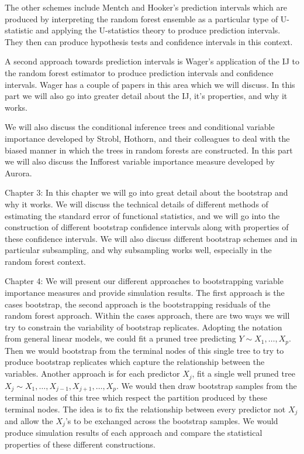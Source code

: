 \documentclass[12pt,twoside]{reedthesis}
\theoremstyle{definition}
\theoremstyle{definition}
\theoremstyle{definition}
\theoremstyle{remark}
\begin{document}
The other schemes include Mentch and Hooker's prediction intervals which
are produced by interpreting the random forest ensemble as a particular
type of U-statistic and applying the U-statistics theory to produce
prediction intervals. They then can produce hypothesis tests and
confidence intervals in this context.

A second approach towards prediction intervals is Wager's application of
the IJ to the random forest estimator to produce prediction intervals
and confidence intervals. Wager has a couple of papers in this area
which we will discuss. In this part we will also go into greater detail
about the IJ, it's properties, and why it works.

We will also discuss the conditional inference trees and conditional
variable importance developed by Strobl, Hothorn, and their colleagues
to deal with the biased manner in which the trees in random forests are
constructed. In this part we will also discuss the Infforest variable
importance measure developed by Aurora.

Chapter 3: In this chapter we will go into great detail about the
bootstrap and why it works. We will discuss the technical details of
different methods of estimating the standard error of functional
statistics, and we will go into the construction of different bootstrap
confidence intervals along with properties of these confidence
intervals. We will also discuss different bootstrap schemes and in
particular subsampling, and why subsampling works well, especially in
the random forest context.

Chapter 4: We will present our different approaches to bootstrapping
variable importance measures and provide simulation results. The first
approach is the cases bootstrap, the second approach is the
bootstrapping residuals of the random forest approach. Within the cases
approach, there are two ways we will try to constrain the variability of
bootstrap replicates. Adopting the notation from general linear models,
we could fit a pruned tree predicting \(Y\sim X_1,\ldots,X_p\). Then we
would bootstrap from the terminal nodes of this single tree to try to
produce bootstrap replicates which capture the relationship between the
variables. Another approach is for each predictor \(X_j\), fit a single
well pruned tree \(X_j\sim X_1,\ldots,X_{j-1},X_{j+1},\ldots,X_p\). We
would then draw bootstrap samples from the terminal nodes of this tree
which respect the partition produced by these terminal nodes. The idea
is to fix the relationship between every predictor not \(X_j\) and allow
the \(X_j\)'s to be exchanged across the bootstrap samples. We would
produce simulation results of each approach and compare the statistical
properties of these different constructions.
\end{document}
